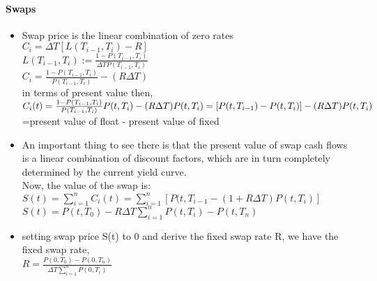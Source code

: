 \documentclass[12pt]{article}
\begin{document}
\paragraph{Swaps}
\begin{itemize}
	\item Swap price is the linear combination of zero rates\\
	${C_i = \Delta T[L(T_{i-1}, T_i)-R]}$\\
	${L(T_{i-1}, T_i):= \frac{1-P(T_{i-1}, T_i)}{\Delta T P(T_{i-1}, T_i)}}$\\
	${C_i=\frac{1-P(T_{i-1}, T_i)}{P(T_{i-1}, T_i)}-(R\Delta T)}$\\
	in terms of present value then,\\
	${C_i(t)={\frac{1-P(T_{i-1}, T_i)}{P(T_{i-1}, T_i)} P(t, T_{i})}-(R\Delta T)P(t,T_i)}\\=[P(t, T_{i-1})- P(t, T_i)]-(R\Delta T) P(t, T_i)$\\
	=present value of float - present value of fixed
	\\
	\item An important thing to see there is that the present value of swap cash flows is a linear combination of discount factors, which are in turn completely determined by the current yield curve.\\
	
	Now, the value of the swap is:\\
	${S(t)=\sum_{i=1}^n C_i(t)=\sum_{i=1}^n [P(t, T_{i-1}-(1+R\Delta T ) P(t, T_i)]}$\\
	
		 ${S(t)=P(t, T_0)-R \Delta T \sum_{i=1}^{n} P(t, T_i) -P(t, T_n) }$ 
	\item setting swap price S(t) to 0 and derive the fixed swap rate R, we have the fixed swap rate,\\
	${R=\frac{P(0, T_0)-P(0, T_n)}{\Delta T \sum_{i=1}^n P(0, T_i)} }$ 
  
\end{itemize}
\end{document}
